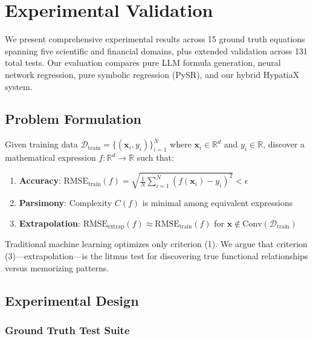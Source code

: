 \documentclass[twoside,11pt]{article}
\begin{document}
\section{Experimental Validation}
\label{sec:experiments}

We present comprehensive experimental results across 15 ground truth equations spanning five scientific and financial domains, plus extended validation across 131 total tests. Our evaluation compares pure LLM formula generation, neural network regression, pure symbolic regression (PySR), and our hybrid HypatiaX system\citep{la2021contemporary}\citep{virtanen2020scipy}\citep{kambhampati2024llms}.

\subsection{Problem Formulation}

\begin{definition}
Given training data $\mathcal{D}_{\text{train}} = \{(\mathbf{x}_i, y_i)\}_{i=1}^N$ where $\mathbf{x}_i \in \mathbb{R}^d$ and $y_i \in \mathbb{R}$, discover a mathematical expression $f: \mathbb{R}^d \to \mathbb{R}$ such that:
\begin{enumerate}
    \item \textbf{Accuracy}: $\text{RMSE}_{\text{train}}(f) = \sqrt{\frac{1}{N}\sum_{i=1}^N (f(\mathbf{x}_i) - y_i)^2} < \epsilon$
    \item \textbf{Parsimony}: Complexity $C(f)$ is minimal among equivalent expressions
    \item \textbf{Extrapolation}: $\text{RMSE}_{\text{extrap}}(f) \approx \text{RMSE}_{\text{train}}(f)$ for $\mathbf{x} \notin \text{Conv}(\mathcal{D}_{\text{train}})$
\end{enumerate}
\end{definition}

Traditional machine learning optimizes only criterion (1). We argue that criterion (3)---extrapolation---is the litmus test for discovering true functional relationships versus memorizing patterns\citep{molnar2020interpretable}\citep{rudin2019stop}.

\subsection{Experimental Design}

\subsubsection{Ground Truth Test Suite}
\end{document}
